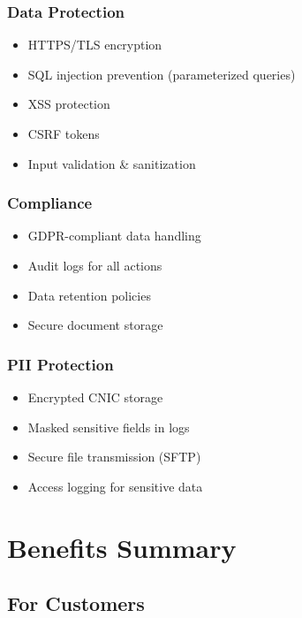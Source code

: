\documentclass[12pt,a4paper]{article}
\begin{document}
\subsubsection{Data Protection}
\begin{itemize}
    \item HTTPS/TLS encryption
    \item SQL injection prevention (parameterized queries)
    \item XSS protection
    \item CSRF tokens
    \item Input validation \& sanitization
\end{itemize}

\subsubsection{Compliance}
\begin{itemize}
    \item GDPR-compliant data handling
    \item Audit logs for all actions
    \item Data retention policies
    \item Secure document storage
\end{itemize}

\subsubsection{PII Protection}
\begin{itemize}
    \item Encrypted CNIC storage
    \item Masked sensitive fields in logs
    \item Secure file transmission (SFTP)
    \item Access logging for sensitive data
\end{itemize}

\newpage

\section{Benefits Summary}

\subsection{For Customers}
\end{document}
